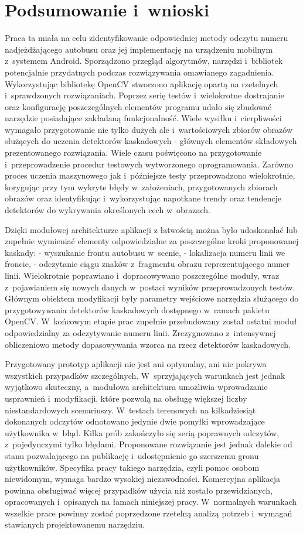 \chapter{Podsumowanie i~wnioski}

Praca ta miała na celu zidentyfikowanie odpowiedniej metody
odczytu numeru nadjeżdżającego autobusu oraz jej implementację
na urządzeniu mobilnym z~systemem Android. 
Sporządzono przegląd algorytmów, narzędzi i~bibliotek
potencjalnie przydatnych podczas rozwiązywania omawianego zagadnienia.
Wykorzystując bibliotekę OpenCV stworzono aplikację 
opartą na rzetelnych i~sprawdzonych rozwiązaniach.
Poprzez serię testów i~wielokrotne dostrajanie oraz konfigurację poszczególnych elementów
programu udało się zbudować narzędzie
posiadające zakładaną funkcjonalność. Wiele wysiłku i~cierpliwości
wymagało przygotowanie nie tylko dużych ale i~wartościowych
zbiorów obrazów służących do uczenia detektorów kaskadowych - głównych
elementów składowych prezentowanego rozwiązania. Wiele czasu 
poświęcono na przygotowanie i~przeprowadzenie procedur
testowych wytworzonego oprogramowania. Zarówno proces uczenia
maszynowego jak i~późniejsze testy przeprowadzono wielokrotnie,
korygując przy tym wykryte błędy w~założeniach, przygotowanych 
zbiorach obrazów oraz identyfikując i~wykorzystując napotkane 
trendy oraz tendencje detektorów do wykrywania określonych cech w~obrazach.

Dzięki modułowej architekturze aplikacji z łatwością można było 
udoskonalać lub zupełnie wymieniać elementy odpowiedzialne za poszczególne 
kroki proponowanej kaskady:
- wyszukanie frontu autobusu w~scenie,
- lokalizacja numeru linii we froncie,
- odczytanie ciągu znaków z~fragmentu obrazu reprezentującego numer linii.
Wielokrotnie poprawiano i~dopracowywano poszczególne 
moduły, wraz z~pojawianiem się nowych danych w~postaci wyników przeprowadzonych testów.
Głównym obiektem modyfikacji były parametry wejściowe narzędzia służącego do przygotowywania
detektorów kaskadowych dostępnego w~ramach pakietu OpenCV. W~końcowym
etapie prac zupełnie przebudowany został ostatni moduł odpowiedzialny za odczytywanie
numeru linii. Zrezygnowano z~intensywnej obliczeniowo metody dopasowywania
wzorca na rzecz detektorów kaskadowych.

Przygotowany prototyp aplikacji nie jest ani optymalny, ani nie 
pokrywa wszystkich przypadków szczególnych. W~sprzyjających warunkach
jest jednak wyjątkowo skuteczny, a~modułowa architektura umożliwia
wprowadzanie usprawnień i~modyfikacji, które pozwolą na obsługę większej
liczby niestandardowych scenariuszy.
W~testach terenowych na kilkadziesiąt dokonanych 
  odczytów odnotowano jedynie dwie pomyłki wprowadzające użytkownika w~błąd.
Kilka prób zakończyło się serią poprawnych odczytów, z~pojedynczymi tylko błędami. 
Proponowane rozwiązanie
jest jednak dalekie od stanu pozwalającego na publikację
i~udostępnienie go szerszemu gronu użytkowników. Specyfika pracy takiego narzędzia,
czyli pomoc osobom niewidomym, wymaga bardzo wysokiej niezawodności.
Komercyjna aplikacja powinna obsługiwać więcej przypadków użycia niż
zostało przewidzianych, opracowanych i~opisanych na łamach niniejszej
pracy. W~normalnych warunkach wszelkie prace powinny zostać
poprzedzone rzetelną analizą potrzeb i~wymagań stawianych projektowanemu 
narzędziu.

